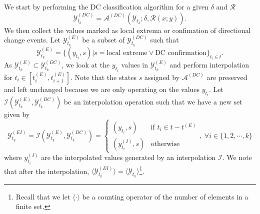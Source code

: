 We start by performing the DC classification algorithm for a given $\delta$ and $\mathcal{R}$
\begin{equation*}
    \mathcal{Y}^{(DC)}_{t_k} = \mathcal{A}^{(DC)} (\mathcal{Y}_{t_k}; \delta, \mathcal{R} (x; y)).
\end{equation*}
We then collect the values marked as local extrema or confimation of directional change events. Let $\mathcal{Y}^{(E)}_{t_k}$ be a subset of $\mathcal{Y}^{(DC)}_{t_k}$ such that
\begin{equation*}
    \mathcal{Y}^{(E)}_{t_k} = \{(y_{t_i}, s) | s = \text{local extreme} \vee \text{DC confirmation} \}_{t_i \in t}.
\end{equation*}
As $\mathcal{Y}^{(E)}_{t_k} \subset \mathcal{Y}^{(DC)}_{t_k}$, we look at the $y_{t_i}$ values in $\mathcal{Y}^{(E)}_{t_k}$ and perform interpolation for $t_i \in [t^{(E)}_i, t^{(E)}_{i+1}]$. Note that the states $s$ assigned by $\mathcal{A}^{(DC)}$ are preserved and left unchanged because we are only operating on the values $y_{t_i}$. Let $\mathcal{I} (\mathcal{Y}^{(E)}_{t_k}, \mathcal{Y}^{(DC)}_{t_k})$ be an interpolation operation such that we have a new set given by
\begin{equation*}
    \mathcal{Y}^{(EI)}_{t_k} = \mathcal{I} (\mathcal{Y}^{(E)}_{t_k}, \mathcal{Y}^{(DC)}_{t_k}) = \begin{cases}
        (y_{t_i}, s)          &\text{if $t_i \in t - t^{(E)}$} \\
        (y^{(I)}_{t_i}, s)    &\text{otherwise}
    \end{cases}, \; \forall i \in \{1, 2, \cdots, k\}
\end{equation*}
where $y^{(I)}_{t_i}$ are the interpolated values generated by an interpolation $\mathcal{I}$. We note that after the interpolation, $\langle \mathcal{Y}^{(EI)}_{t_k} \rangle = \langle \mathcal{Y}_{t_k} \rangle$\footnote{Recall that we let $\langle \cdot \rangle$ be a counting operator of the number of elements in a finite set.}.

